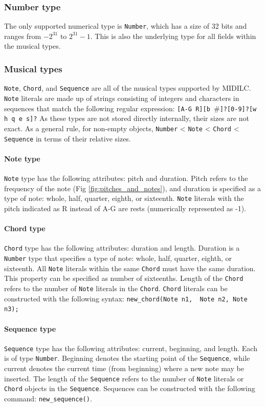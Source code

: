 \documentclass[12pt,A4]{book}
\begin{document}
\subsubsection{Number type}
The only supported numerical type is \verb|Number|, which has a size of 32 bits and ranges from $-2^{31}$ to $2^{31} - 1$.  This is also the underlying type for all fields within the musical types.
\subsubsection{Musical types}
\verb|Note|, \verb|Chord|, and \verb|Sequence| are all of the musical types supported by MIDILC. \verb|Note| literals are  made up of strings consisting of integers and characters in sequences that match the following regular expression:
\verb|[A-G R][b |\#\verb|]?[0-9]?[w h q e s]?|
As these types are not stored directly internally, their sizes are not exact. As a general rule, for non-empty objects,
\verb|Number| < \verb|Note| < \verb|Chord| < \verb|Sequence| in terms of their relative sizes.
\paragraph{Note type}
\verb|Note| type has the following attributes: pitch and duration. Pitch refers to the frequency of the note (Fig \ref{fig:pitches_and_notes}), and duration is specified as a type of note: whole, half, quarter, eighth, or sixteenth.  \verb|Note| literals with the pitch indicated as R instead of A-G are rests (numerically represented as -1).
\paragraph{Chord type}
\verb|Chord| type has the following attributes: duration and length. Duration is a \verb|Number| type that specifies a type of note: whole, half, quarter, eighth, or sixteenth. All \verb|Note| literals within the same \verb|Chord| must have the same duration.  This property can be specified as number of sixteenths. Length of the \verb|Chord| refers to the number of \verb|Note| literals in the \verb|Chord|.
\verb|Chord| literals can be constructed with the following syntax: \verb|new_chord(Note n1,  Note n2, Note n3);|
\paragraph{Sequence type}
\verb|Sequence| type has the following attributes: current, beginning, and length. Each is of type \verb|Number|. Beginning denotes the starting point of the \verb|Sequence|, while current denotes the current time (from beginning) where a new note may be inserted. The length of the \verb|Sequence| refers to the number of \verb|Note| literals or \verb|Chord| objects in the \verb|Sequence|. Sequences can be constructed with the following command: \verb|new_sequence()|.
\end{document}
